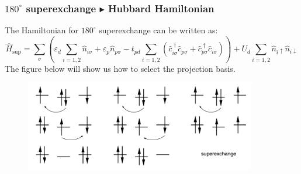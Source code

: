 \documentclass{beamer}
\begin{document}
  \begin{frame}
    \frametitle{\(180^{\circ}\) superexchange \(\blacktriangleright\) Hubbard Hamiltonian}\footnotesize
    The Hamiltonian for \(180^{\circ}\) superexchange can be written as:
    \begin{equation}
      \widehat{H}_{\text{sup}} = \sum_{\sigma} \left(\varepsilon_d\sum_{i=1,2}\widehat{n}_{i\sigma}+\varepsilon_p\widehat{n}_{p\sigma}-t_{pd}\sum_{i=1,2}\left(\widehat{c}_{i\sigma}^{\;\dagger}\widehat{c}_{p\sigma}+\widehat{c}_{p\sigma}^{\;\dagger}\widehat{c}_{i\sigma}\right)\right) + U_d \sum_{i=1,2}\widehat{n}_{i\uparrow}\widehat{n}_{i\downarrow}
    \end{equation}
    The figure below will show us how to select the projection basis.
    \begin{figure}
      \centering 
      \includegraphics[width=0.9\textwidth]{figure/180-supex-basis.png}
    \end{figure}
  \end{frame}
\end{document}
